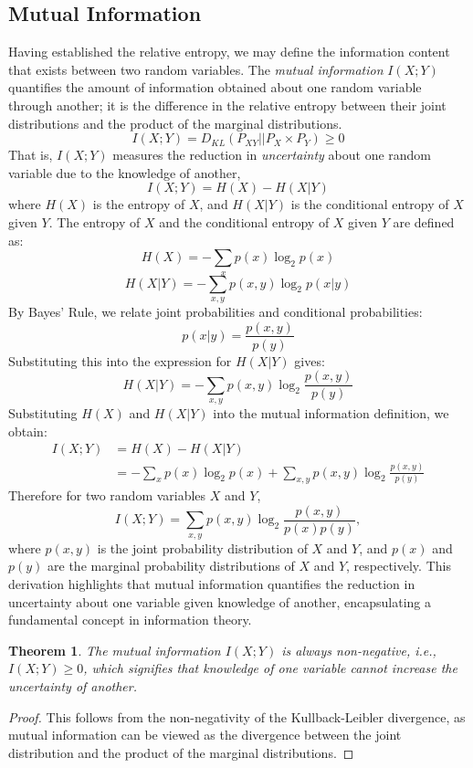\documentclass[12pt]{article}
\newtheorem{theorem}{Theorem}
\begin{document}
		\subsection{Mutual Information}
		Having established the relative entropy, we may define the information content that exists between two random variables. The \emph{mutual information} $I(X; Y)$ quantifies the amount of information obtained about one random variable through another; it is the difference in the relative entropy between their joint distributions and the product of the marginal distributions. 
		\[I(X; Y) = D_{KL} ( P_{XY} || P_{X} \times P_{Y}  ) \geq 0  \]
		That is, $I(X; Y)$ measures the reduction in \emph{uncertainty}	about one random variable due to the knowledge of another,
		\[I(X; Y) = H(X) - H(X|Y)\]
		where $H(X)$ is the entropy of $X$, and $H(X|Y)$ is the conditional entropy of $X$ given $Y$. The entropy of $X$ and the conditional entropy of $X$ given $Y$ are defined as:
		\[H(X) = -\sum_{x} p(x) \log_2 p(x)\]
		\[H(X|Y) = -\sum_{x,y} p(x,y) \log_2 p(x|y)\]
		By Bayes' Rule, we relate joint probabilities and conditional probabilities:
		\[p(x|y) = \frac{p(x,y)}{p(y)}\]
		Substituting this into the expression for $H(X|Y)$ gives:
		\[H(X|Y) = -\sum_{x,y} p(x,y) \log_2 \frac{p(x,y)}{p(y)}\]
		Substituting $H(X)$ and $H(X|Y)$ into the mutual information definition, we obtain:
		\[
		\begin{aligned}
			I(X; Y) &= H(X) - H(X|Y) \\
			&= -\sum_{x} p(x) \log_2 p(x) + \sum_{x,y} p(x,y) \log_2 \frac{p(x,y)}{p(y)} 
		\end{aligned}
		\]
		Therefore for two random variables $X$ and $Y$, 
		\begin{equation}
			I(X; Y) = \sum_{x,y} p(x,y) \log_2 \frac{p(x,y)}{p(x)p(y)},
		\end{equation}
		where $p(x,y)$ is the joint probability distribution of $X$ and $Y$, and $p(x)$ and $p(y)$ are the marginal probability distributions of $X$ and $Y$, respectively. This derivation highlights that mutual information quantifies the reduction in uncertainty about one variable given knowledge of another, encapsulating a fundamental concept in information theory.
		\begin{theorem}
			The mutual information \(I(X; Y)\) is always non-negative, i.e., \(I(X; Y) \geq 0\), which signifies that knowledge of one variable cannot increase the uncertainty of another.
		\end{theorem}
		\begin{proof}
			This follows from the non-negativity of the Kullback-Leibler divergence, as mutual information can be viewed as the divergence between the joint distribution and the product of the marginal distributions.
		\end{proof}
		
\end{document}
